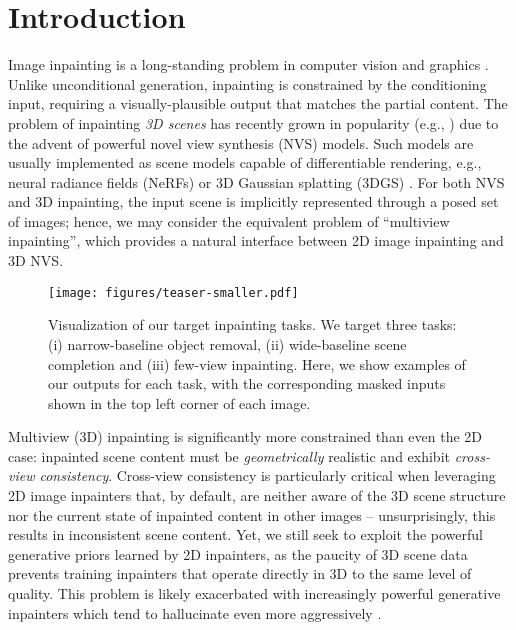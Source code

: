 
\vspace{-2em}\section{Introduction}
\label{sec:intro}

Image inpainting is a long-standing problem in computer vision and graphics \cite{bertalmioimage}.
Unlike unconditional generation, inpainting is constrained by the conditioning input, requiring a visually-plausible output that matches the partial content.
The problem of inpainting \textit{3D scenes} has recently grown in popularity (e.g., \cite{spinnerf,nerf.in}) due to the advent of powerful novel view synthesis (NVS) models.
Such models are usually implemented as scene models capable of differentiable rendering, e.g., neural radiance fields (NeRFs) \cite{original.nerf} or 3D Gaussian splatting (3DGS) \cite{kerbl3Dgaussians}.
For both NVS and 3D inpainting, the input scene is implicitly represented through a posed set of images; hence, we may consider the equivalent problem of ``multiview inpainting'', which provides a natural interface between 2D image inpainting and 3D NVS.
     
\begin{figure}[t]
    \centering
    \texttt{[image: figures/teaser-smaller.pdf]}
    \vspace{-15pt}
    \caption{Visualization of our target inpainting tasks.
    We target three tasks: (i) narrow-baseline object removal,
    (ii) wide-baseline scene completion and (iii) few-view inpainting.
    Here, we show examples of our outputs for each task, with
    the corresponding masked inputs shown in the top left corner of each image.
    }
    \label{fig:teaser}
    \vspace{-15pt}
\end{figure}

Multiview (3D) inpainting is significantly more constrained than even the 2D case: inpainted scene content must be \textit{geometrically} realistic and exhibit \textit{cross-view consistency}.
Cross-view consistency is particularly critical when leveraging 2D image inpainters that, by default, are neither aware of the 3D scene structure nor the current state of inpainted content in other images -- unsurprisingly, this results in inconsistent scene content. 
Yet, we still seek to exploit the powerful generative priors learned by 2D inpainters, as the paucity of 3D scene data prevents training inpainters that operate directly in 3D to the same level of quality.
This problem is likely exacerbated with increasingly powerful generative inpainters which tend to hallucinate even more aggressively \cite{reference.guided.nerf}.

